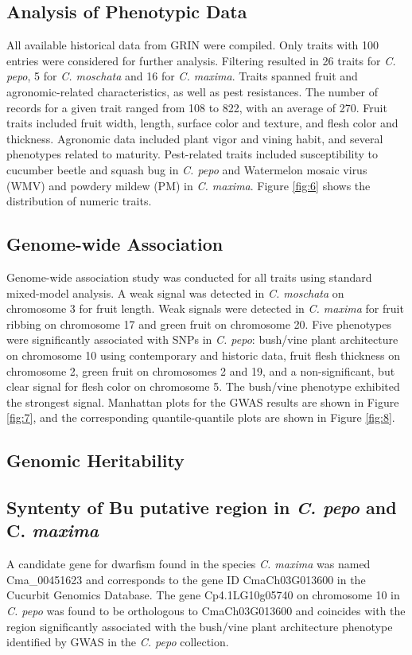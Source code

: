 \documentclass[utf8]{FrontiersinHarvard} %
\begin{document}
\subsection{Analysis of Phenotypic Data}
All available historical data from GRIN were compiled. Only traits with  100 entries were considered for further analysis. Filtering resulted in 26 traits for \textit{C. pepo}, 5 for \textit{C. moschata} and 16 for \textit{C. maxima}. Traits spanned fruit and agronomic-related characteristics, as well as pest resistances. The number of records for a given trait ranged from 108 to 822, with an average of  270. Fruit traits included fruit width, length, surface color and texture, and flesh color and thickness. Agronomic data included plant vigor and vining habit, and several phenotypes related to maturity. Pest-related traits included susceptibility to cucumber beetle and squash bug in \textit{C. pepo} and Watermelon mosaic virus (WMV) and powdery mildew (PM) in \textit{C. maxima}. Figure \ref{fig:6} shows the distribution of numeric traits. 

\subsection{Genome-wide Association}
Genome-wide association study was conducted for all traits using standard mixed-model analysis. A weak signal was detected in \textit{C. moschata} on chromosome 3 for fruit length. Weak signals were detected in \textit{C. maxima} for fruit ribbing on chromosome 17 and green fruit on chromosome 20. Five phenotypes were significantly associated with SNPs in \textit{C. pepo}: bush/vine plant architecture on chromosome 10 using contemporary and historic data, fruit flesh thickness on chromosome 2, green fruit on chromosomes 2 and 19, and a non-significant, but clear signal for flesh color on chromosome 5. The bush/vine phenotype exhibited the strongest signal. Manhattan plots for the GWAS results are shown in Figure \ref{fig:7}, and the corresponding quantile-quantile plots are shown in Figure \ref{fig:8}.

\subsection{Genomic Heritability}

\subsection{Syntenty of Bu putative region in \textit{C. pepo} and C. \textit{maxima}}
A candidate gene for dwarfism found in the species \textit{C. maxima} was named Cma\_00451623 and corresponds to the gene ID CmaCh03G013600 in the Cucurbit Genomics Database. The gene Cp4.1LG10g05740 on chromosome 10 in \textit{C. pepo} was found to be orthologous to CmaCh03G013600 and coincides with the region significantly associated with the bush/vine plant architecture phenotype identified by GWAS in the \textit{C. pepo} collection. 
\end{document}
